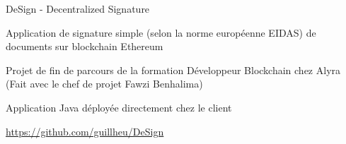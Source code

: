 \begin{cventries}
{      }
  \cventry
    {} %
    {DeSign - Decentralized Signature} %
    {} %
    {} %
    {
      \begin{cvitems} %
        \item {Application de signature simple (selon la norme européenne EIDAS) de documents sur blockchain Ethereum}
        \item {Projet de fin de parcours de la formation Développeur Blockchain chez Alyra (Fait avec le chef de projet Fawzi Benhalima)}
        \item {Application Java déployée directement chez le client}
        \item {\underline{\href{https://github.com/guillheu/DeSign}{https://github.com/guillheu/DeSign}}\\}
      \end{cvitems}
    }
 

\end{cventries}
